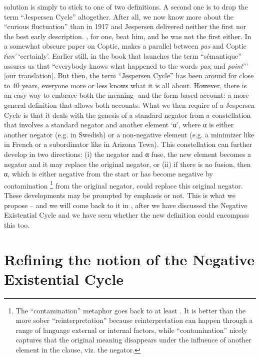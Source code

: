 ﻿\documentclass[output=paper]{langsci/langscibook}
\begin{document}
solution is simply to stick to one of two definitions. A second one is to
drop the term ``Jespersen Cycle'' altogether. After all, we now know more
about the ``curious fluctuation'' than in 1917 and Jespersen delivered
neither the first nor the best early description. \textcite{Meillet1912}, for
one, beat him, and he was not the first either. In a somewhat obscure paper
on Coptic, \textcite{Gardiner1904} makes a parallel between \textit{pas} and
Coptic \textit{ı͗wn'} `certainly'. Earlier still, in the book that launches
the term ``sémantique'' \textcite[22]{Breal1897} assures us that ``everybody
knows what happened to the words \textit{pas}, and \textit{point}''' [our
translation]. But then, the term ``Jespersen Cycle'' has been around for
close to 40 years, everyone more or less knows what it is all about.
However, there is an easy way to embrace both the meaning- and the
form-based account: a more general definition that allows both accounts.
What we then require of a Jespersen Cycle is that it deals with the genesis
of a standard negator  from a constellation that involves a standard
negator and another element `α', where α is either another negator (e.g. in
Swedish) or a non-negative element (e.g. a minimizer like in
French or a
subordinator like in Arizona Tewa). This constellation can further develop
in two directions: (i) the negator and α fuse, the new element becomes a
negator and it may replace the original negator, or (ii) if there is no
fusion, then α, which is either negative from the start or has become
negative by contamination%
%
\footnote{The ``contamination'' metaphor goes
back to at least \textcite[221--226]{Breal1897}. It is better than the more
sober ``reinterpretation'' because reinterpretation can happen through a
range of language external or internal factors, while ``contamination''
nicely captures that the original meaning disappears under the influence of
another element in the clause, viz. the negator.} %
%
from the original
negator, could replace this original negator. These developments may be
prompted by emphasis or not. This is what we propose -- and we will come
back to it in , after we have discussed the Negative Existential
Cycle and we have seen whether the new definition could encompass this too. 

\section{Refining the notion of the Negative Existential
Cycle}\label{sec:int-3}
\end{document}
